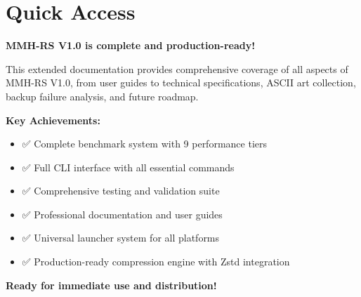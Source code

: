 \documentclass[11pt,a4paper]{article}
\begin{document}
	\section{Quick Access}
	\label{sec:quickaccess}

	\begin{center}
	\end{center}

	\begin{center}
	\end{center}

	\begin{successbox}
	\textbf{MMH-RS V1.0 is complete and production-ready!}

	This extended documentation provides comprehensive coverage of all aspects of MMH-RS V1.0, from user guides to technical specifications, ASCII art collection, backup failure analysis, and future roadmap.

	\textbf{Key Achievements:}
	\begin{itemize}
		\item ✅ Complete benchmark system with 9 performance tiers
		\item ✅ Full CLI interface with all essential commands
		\item ✅ Comprehensive testing and validation suite
		\item ✅ Professional documentation and user guides
		\item ✅ Universal launcher system for all platforms
		\item ✅ Production-ready compression engine with Zstd integration
	\end{itemize}

	\textbf{Ready for immediate use and distribution!}
	\end{successbox}
\end{document}
